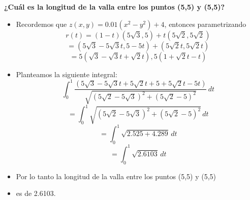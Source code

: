 \documentclass{article}
\begin{document}
    \item \textbf{¿Cuál es la longitud de la valla entre los puntos (5,5) y (5,5)?}
    \begin{itemize}
        \item Recordemos que \(z(x, y) = 0.01(x^2 - y^2) + 4\), entonces parametrizando 
        \[ r(t) = (1-t)(5\sqrt{3},5) + t(5\sqrt{2},5\sqrt{2}) \]
        \[ = (5\sqrt{3} - 5\sqrt{3}t, 5 - 5t) + (5\sqrt{2}t, 5\sqrt{2}t) \]
        \[ = 5 (\sqrt{3} - \sqrt{3}t + \sqrt{2}t), 5(1 + \sqrt{2}t - t) \]
        \item Planteamos la siguiente integral:
        \[ \int_{0}^{1} \frac{(5\sqrt{3} - 5\sqrt{3}t + 5\sqrt{2}t + 5 + 5\sqrt{2}t - 5t)}{\sqrt{(5\sqrt{2} - 5\sqrt{3})^2 + (5\sqrt{2} - 5)^2 }} \, dt \]
        \[ = \int_{0}^{1} \sqrt{(5\sqrt{2} - 5\sqrt{3})^2 + (5\sqrt{2} - 5)^2 } \, dt \]
        \[ = \int_{0}^{1} \sqrt{2.525 + 4.289} \, dt \]
        \[ = \int_{0}^{1} \sqrt{2.6103} \, dt \]
        \item Por lo tanto la longitud de la valla entre los puntos (5,5) y (5,5)
        \item es de 2.6103.
    \end{itemize}

    
\end{document}
